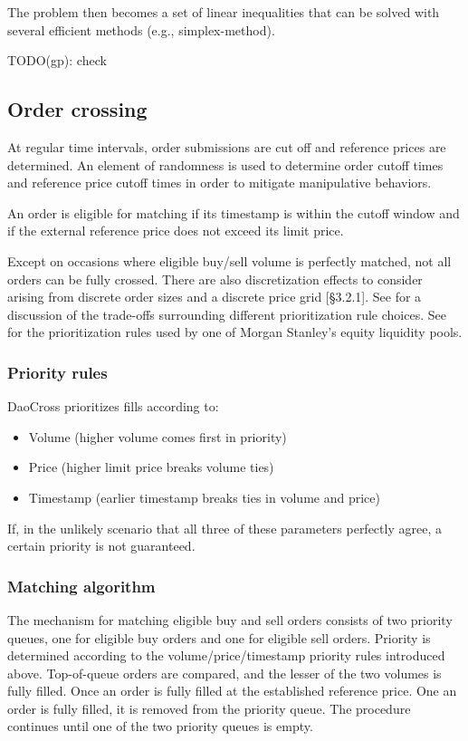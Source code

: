 \documentclass[11pt, reqno]{amsart}
\begin{document}
The problem then becomes a set of linear inequalities that can be solved with
several efficient methods (e.g., simplex-method).

TODO(gp): check


\subsection{Order crossing}
At regular time intervals, order submissions are cut off and reference prices
are determined. An element of randomness is used to determine order cutoff
times and reference price cutoff times in order to
mitigate manipulative behaviors.

An order is eligible for matching if its timestamp is within the cutoff window
and if the external reference price does not exceed its limit price.

Except on occasions where eligible buy/sell volume is perfectly matched, not
all orders can be fully crossed. There are also discretization effects to
consider arising from discrete order sizes and a discrete price grid
\cite{BoBoDoGo18}[\S 3.2.1].
See \cite{BeLaLiVa22} for a discussion of the trade-offs surrounding
different prioritization rule choices. See \cite{MsAts} for the
prioritization rules used by one of Morgan Stanley's equity liquidity pools.

\subsubsection{Priority rules}
DaoCross prioritizes fills according to:
\begin{itemize}
	\item Volume (higher volume comes first in priority)
	\item Price (higher limit price breaks volume ties)
	\item Timestamp (earlier timestamp breaks ties in volume and price)
\end{itemize}
If, in the unlikely scenario that all three of these parameters perfectly
agree, a certain priority is not guaranteed.

\subsubsection{Matching algorithm}
The mechanism for matching eligible buy and sell orders consists of two
priority queues, one for eligible buy orders and one for eligible sell orders.
Priority is determined according to the volume/price/timestamp priority rules
introduced above. Top-of-queue orders are compared, and the lesser of the two
volumes is fully filled. Once an order is fully filled at the established
reference price. One an order is fully filled, it is removed from the priority
queue. The procedure continues until one of the two priority queues is empty.
\end{document}
